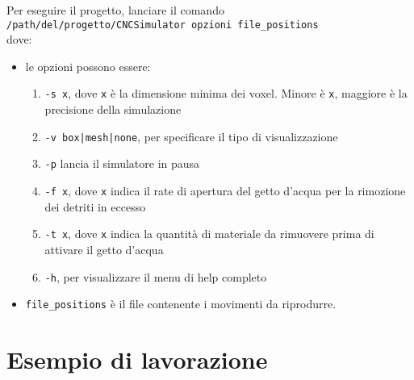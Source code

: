 Per eseguire il progetto, lanciare il comando\\ \verb!/path/del/progetto/CNCSimulator opzioni file_positions!\\ dove:
\begin{itemize}
  \item le opzioni possono essere:
    \begin{enumerate}[noitemsep]
      \item \verb!-s x!, dove \verb!x! è la dimensione minima dei voxel. Minore è \verb!x!, maggiore è la precisione della simulazione
      \item \verb!-v box|mesh|none!, per specificare il tipo di visualizzazione
      \item \verb!-p! lancia il simulatore in pausa
      \item \verb!-f x!, dove \verb!x! indica il rate di apertura del getto d'acqua per la rimozione dei detriti in eccesso
      \item \verb!-t x!, dove \verb!x! indica la quantità di materiale da rimuovere prima di attivare il getto d'acqua
      \item \verb!-h!, per visualizzare il menu di help completo
    \end{enumerate}
  \item \verb!file_positions! è il file contenente i movimenti da riprodurre.
\end{itemize}

\section{Esempio di lavorazione}

